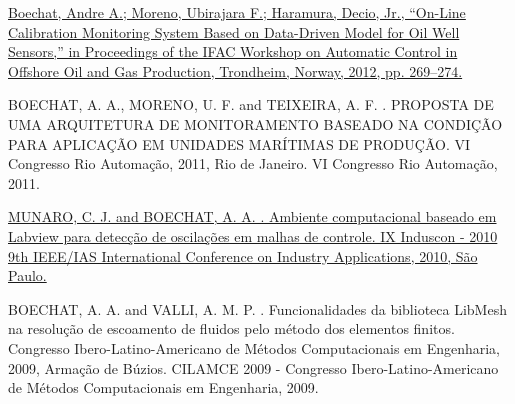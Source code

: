 \documentclass[10pt]{article}
\renewcommand\emph[1]{#1}
\begin{document}
\begin{bibenum}

    \item \href{http://www.ifac-papersonline.net/Detailed/52627.html}{Boechat, Andre A.;
            Moreno, Ubirajara F.; Haramura, Decio, Jr., “On-Line Calibration Monitoring
            System Based on Data-Driven Model for Oil Well Sensors,” in Proceedings of the
            IFAC Workshop on Automatic Control in Offshore Oil and Gas Production,
        Trondheim, Norway, 2012, pp. 269–274.}

    \item BOECHAT, A. A., MORENO, U. F. and TEIXEIRA, A. F. . PROPOSTA DE UMA ARQUITETURA
        DE MONITORAMENTO BASEADO NA CONDIÇÃO PARA APLICAÇÃO EM UNIDADES MARÍTIMAS DE
        PRODUÇÃO. VI Congresso Rio Automação, 2011, Rio de Janeiro. VI Congresso Rio
        Automação, 2011.

    \item
        \href{http://www.labplan.ufsc.br/congressos/Induscon\%202010/fscommand/web/docs/I0187.pdf}{MUNARO,
            C. J. and BOECHAT, A. A. . Ambiente computacional baseado em Labview para
            detecção de oscilações em malhas de controle. IX Induscon - 2010 9th IEEE/IAS
        International Conference on Industry Applications, 2010, São Paulo.}

    \item BOECHAT, A. A. and VALLI, A. M. P. . Funcionalidades da biblioteca LibMesh na
        resolução de escoamento de fluidos pelo método dos elementos finitos. 
        Congresso Ibero-Latino-Americano de Métodos Computacionais em Engenharia, 2009,
        Armação de Búzios. CILAMCE 2009 - Congresso Ibero-Latino-Americano de Métodos
        Computacionais em Engenharia, 2009.


\end{bibenum}
\end{document}
